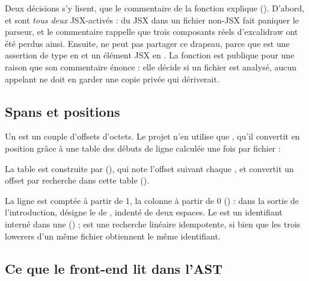 
Deux décisions s'y lisent, que le commentaire de la fonction explique (). D'abord,  et  sont \emph{tous deux} JSX-activés : du JSX dans un fichier non-JSX fait paniquer le parseur, et le commentaire rappelle que trois composants réels d'excalidraw ont été perdus ainsi. Ensuite,  ne peut pas partager ce drapeau, parce que  est une assertion de type en  et un élément JSX en . La fonction est publique pour une raison que son commentaire énonce : elle décide si un fichier est analysé, aucun appelant ne doit en garder une copie privée qui dériverait.

\subsection{Spans et positions}

Un  est un couple  d'offsets d'octets. Le projet n'en utilise que , qu'il convertit en position  grâce à une table des débuts de ligne calculée une fois par fichier :


\noindent La table est construite par  (), qui note l'offset suivant chaque , et  convertit un offset par recherche dans cette table ().

La ligne est comptée à partir de 1, la colonne à partir de 0 () : dans la sortie de l'introduction,  désigne le  de , indenté de deux espaces. Le  est un identifiant interné dans une  () ;  est une recherche linéaire idempotente, si bien que les trois lowerers d'un même fichier obtiennent le même identifiant.

\subsection{Ce que le front-end lit dans l'AST}

